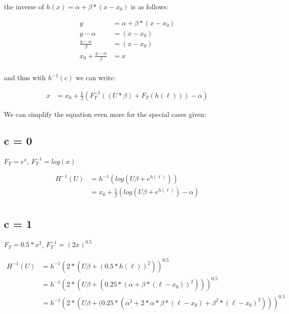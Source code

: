 \documentclass[]{article}
\begin{document}
the inverse of $h(x) = \alpha + \beta * (x - x_0)$ is as follows:

\begin{align*}
y &= \alpha + \beta * (x - x_0) \\
y - \alpha &= (x - x_0) \\
\frac{y - \alpha}{\beta} &=  (x - x_0) \\
x_0 + \frac{y - \alpha}{\beta} &=  x \\
\end{align*}

and thus with $h^{-1}(c)$ we can write:

\begin{align*}
	x &= x_0 + \frac{1}{\beta} \left( F_T^{-1} ( (U * \beta) + F_T(h(\ell))) - \alpha \right)
\end{align*}

We can simplify the equation even more for the special cases given:

\subsection{c = 0}

$F_T = e^x$, $F_T^{-1} = log(x)$

\begin{align*}
H^{-1}(U) &= h^{-1} \left( log \left( U\beta + e^{h(\ell)} \right) \right) \\
		&= x_0 + \frac{1}{\beta} \left( log \left( U\beta + e^{h(\ell)} \right) - \alpha \right) \\
\end{align*}

\subsection{c = 1}

$F_T = 0.5 * x^2$, $F_T^{-1} = (2x)^{0.5}$

\begin{align*}
H^{-1}(U) &= h^{-1} \left( 2 * \left( U\beta + (0.5 *h(\ell))^{2} \right) \right)^{0.5} \\
		  &= h^{-1} \left( 2 * \left( U\beta + (0.25 * (\alpha + \beta * (\ell - x_0))^{2}) \right) \right)^{0.5} \\
		  &= h^{-1} \left( 2 * \left( U\beta + (0.25 * (\alpha^2 + 2 * \alpha * \beta * (\ell - x_0) + \beta^2 * (\ell - x_0)^{2}) \right) \right)^{0.5} \\
\end{align*}
\end{document}
